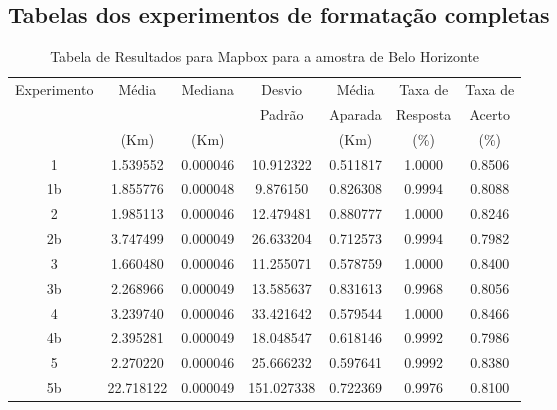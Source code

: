 \begin{anexosenv}
\chapter{Tabelas dos experimentos de formatação completas}
\label{anexo_tabelas_completas}

\begin{table}[ht]
\centering
\begin{tabular}{|c|c|c|c|c|c|c|}
\hline
Experimento & Média & Mediana & Desvio & Média & Taxa de & Taxa de \\
 & & & Padrão & Aparada & Resposta & Acerto \\
 & (Km) & (Km) & & (Km) & (\%) & (\%) \\ \hline
1 & 1.539552 & 0.000046 & 10.912322 & 0.511817 & 1.0000 & 0.8506 \\ \hline
1b & 1.855776 & 0.000048 & 9.876150 & 0.826308 & 0.9994 & 0.8088 \\ \hline
2 & 1.985113 & 0.000046 & 12.479481 & 0.880777 & 1.0000 & 0.8246 \\ \hline
2b & 3.747499 & 0.000049 & 26.633204 & 0.712573 & 0.9994 & 0.7982 \\ \hline
3 & 1.660480 & 0.000046 & 11.255071 & 0.578759 & 1.0000 & 0.8400 \\ \hline
3b & 2.268966 & 0.000049 & 13.585637 & 0.831613 & 0.9968 & 0.8056 \\ \hline
4 & 3.239740 & 0.000046 & 33.421642 & 0.579544 & 1.0000 & 0.8466 \\ \hline
4b & 2.395281 & 0.000049 & 18.048547 & 0.618146 & 0.9992 & 0.7986 \\ \hline
5 & 2.270220 & 0.000046 & 25.666232 & 0.597641 & 0.9992 & 0.8380 \\ \hline
5b & 22.718122 & 0.000049 & 151.027338 & 0.722369 & 0.9976 & 0.8100 \\ \hline
\end{tabular}
\caption{Tabela de Resultados para Mapbox para a amostra de Belo Horizonte}
\label{tab:mapboxBH}
\end{table}


\end{anexosenv}

